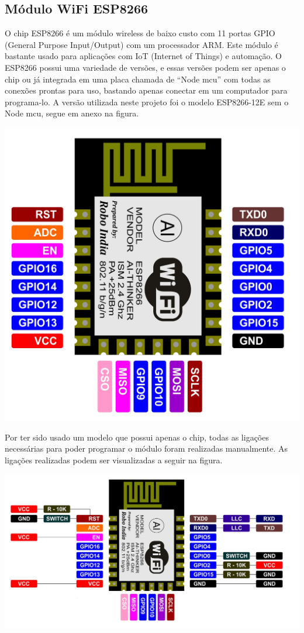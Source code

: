 \subsection{Módulo WiFi ESP8266}
	O chip ESP8266 é um módulo wireless de baixo custo com 11 portas GPIO (General Purpose Input/Output) com um processador ARM. Este módulo é bastante usado para aplicações com IoT (Internet of Things) e automação.
	O ESP8266 possui uma variedade de versões, e essas versões podem ser apenas o chip ou já integrada em uma placa chamada de “Node mcu” com todas as conexões prontas para uso, bastando apenas conectar em um computador para programa-lo. A versão utilizada neste projeto foi o modelo ESP8266-12E sem o Node mcu, segue em anexo na figura.
    \begin{center}
    	\includegraphics[scale=0.9]{figuras/esp_pinout}
    \end{center}   
	Por ter sido usado um modelo que possui apenas o chip, todas as ligações necessárias para poder programar o módulo foram realizadas manualmente. As ligações realizadas podem ser visualizadas a seguir na figura.
    \begin{center}
    	\includegraphics[scale=0.5]{figuras/esp_connects}
    \end{center}
